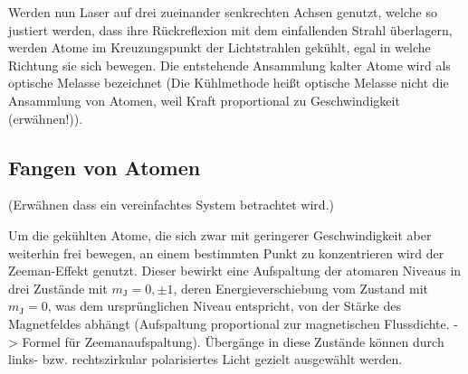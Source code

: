 \documentclass[11pt, a4paper]{article}
\numberwithin{equation}{section}
\newcommand{\korr}[1]{{\color{red}(#1)}}
\begin{document}
Werden nun Laser auf drei zueinander senkrechten Achsen genutzt, welche so justiert werden, dass ihre Rückreflexion mit dem einfallenden Strahl überlagern, werden Atome im Kreuzungspunkt der Lichtstrahlen gekühlt, egal in welche Richtung sie sich bewegen.
Die entstehende Ansammlung kalter Atome wird als optische Melasse bezeichnet \korr{Die Kühlmethode heißt optische Melasse nicht die Ansammlung von Atomen, weil Kraft proportional zu Geschwindigkeit (erwähnen!)}.

\subsection{Fangen von Atomen}
\korr{Erwähnen dass ein vereinfachtes System betrachtet wird.}


Um die gekühlten Atome, die sich zwar mit geringerer Geschwindigkeit aber weiterhin frei bewegen, an einem bestimmten Punkt zu konzentrieren wird der Zeeman-Effekt genutzt.
Dieser bewirkt eine Aufspaltung der atomaren Niveaus in drei Zustände mit $m_\mathrm{J} = 0, \pm1$, deren Energieverschiebung vom Zustand mit $m_\mathrm{J}=0$, was dem ursprünglichen Niveau entspricht, von der Stärke des Magnetfeldes abhängt \korr{Aufspaltung proportional zur magnetischen Flussdichte. -> Formel für Zeemanaufspaltung}.
Übergänge in diese Zustände können durch links- bzw. rechtszirkular polarisiertes Licht gezielt ausgewählt werden.
\end{document}
